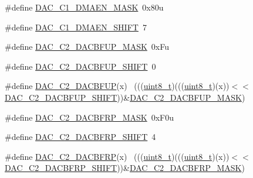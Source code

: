 \begin{DoxyCompactItemize}
\item 
\#define \hyperlink{group___d_a_c___register___masks_ga091be41dfd851b71978ab7298c372292}{D\+A\+C\+\_\+\+C1\+\_\+\+D\+M\+A\+E\+N\+\_\+\+M\+A\+SK}~0x80u
\item 
\#define \hyperlink{group___d_a_c___register___masks_ga481f558223c5c36402bebe924bdd00a3}{D\+A\+C\+\_\+\+C1\+\_\+\+D\+M\+A\+E\+N\+\_\+\+S\+H\+I\+FT}~7
\item 
\#define \hyperlink{group___d_a_c___register___masks_ga329015367026aaee34f54edcbaab61bb}{D\+A\+C\+\_\+\+C2\+\_\+\+D\+A\+C\+B\+F\+U\+P\+\_\+\+M\+A\+SK}~0x\+Fu
\item 
\#define \hyperlink{group___d_a_c___register___masks_ga5d43a79719748e490a572fa6cdc75efe}{D\+A\+C\+\_\+\+C2\+\_\+\+D\+A\+C\+B\+F\+U\+P\+\_\+\+S\+H\+I\+FT}~0
\item 
\#define \hyperlink{group___d_a_c___register___masks_gad53572a2ce126813380890d433a76dfb}{D\+A\+C\+\_\+\+C2\+\_\+\+D\+A\+C\+B\+F\+UP}(x)                                            ~(((\hyperlink{_p_e___types_8h_aba7bc1797add20fe3efdf37ced1182c5}{uint8\+\_\+t})(((\hyperlink{_p_e___types_8h_aba7bc1797add20fe3efdf37ced1182c5}{uint8\+\_\+t})(x))$<$$<$\hyperlink{group___d_a_c___register___masks_ga5d43a79719748e490a572fa6cdc75efe}{D\+A\+C\+\_\+\+C2\+\_\+\+D\+A\+C\+B\+F\+U\+P\+\_\+\+S\+H\+I\+FT}))\&\hyperlink{group___d_a_c___register___masks_ga329015367026aaee34f54edcbaab61bb}{D\+A\+C\+\_\+\+C2\+\_\+\+D\+A\+C\+B\+F\+U\+P\+\_\+\+M\+A\+SK})
\item 
\#define \hyperlink{group___d_a_c___register___masks_ga64b53e5effabf2e736fca6088752e6ea}{D\+A\+C\+\_\+\+C2\+\_\+\+D\+A\+C\+B\+F\+R\+P\+\_\+\+M\+A\+SK}~0x\+F0u
\item 
\#define \hyperlink{group___d_a_c___register___masks_ga0ab880f693c25ecf491d3b76df611456}{D\+A\+C\+\_\+\+C2\+\_\+\+D\+A\+C\+B\+F\+R\+P\+\_\+\+S\+H\+I\+FT}~4
\item 
\#define \hyperlink{group___d_a_c___register___masks_ga754cc2916d174990b54658380eaf0adc}{D\+A\+C\+\_\+\+C2\+\_\+\+D\+A\+C\+B\+F\+RP}(x)                                            ~(((\hyperlink{_p_e___types_8h_aba7bc1797add20fe3efdf37ced1182c5}{uint8\+\_\+t})(((\hyperlink{_p_e___types_8h_aba7bc1797add20fe3efdf37ced1182c5}{uint8\+\_\+t})(x))$<$$<$\hyperlink{group___d_a_c___register___masks_ga0ab880f693c25ecf491d3b76df611456}{D\+A\+C\+\_\+\+C2\+\_\+\+D\+A\+C\+B\+F\+R\+P\+\_\+\+S\+H\+I\+FT}))\&\hyperlink{group___d_a_c___register___masks_ga64b53e5effabf2e736fca6088752e6ea}{D\+A\+C\+\_\+\+C2\+\_\+\+D\+A\+C\+B\+F\+R\+P\+\_\+\+M\+A\+SK})
\item 

\end{DoxyCompactItemize}

